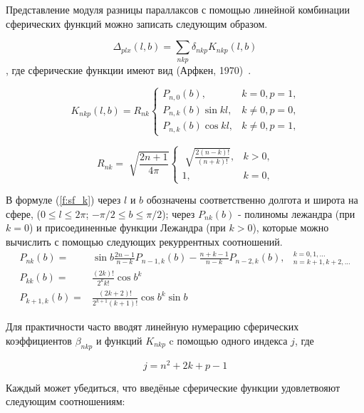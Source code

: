 \documentclass[14pt]{article} %
\begin{document}
Представление модуля разницы параллаксов с помощью линейной комбинации сферических функций можно записать следующим образом.


$$ \Delta_{plx} (l,b) = \sum_{nkp}\delta_{nkp}K_{nkp}(l,b) $$,
где сферические функции имеют вид (Арфкен, 1970)~\cite{book:arfken}.

\begin{equation}\label{f:sf_k}
K_{nkp}(l,b) = R_{nk} \left\{ \begin{array}{ll}
P_{n,0}(b), & \textrm{$k=0, p=1$,}\\
P_{n,k}(b)\sin{kl}, & \textrm{$k\neq0, p=0$,}\\
P_{n,k}(b)\cos{kl}, & \textrm{$k\neq0, p=1$,}
\end{array} \right.
\end{equation}

\begin{equation}
R_{nk} = \sqrt[]{\frac{2n+1}{4\pi}} \left\{ \begin{array}{cc}
\sqrt[]{\frac{2(n-k)!}{(n+k)!}}, & \textrm{$k>0$,}\\
1, & \textrm{$k=0$,}
\end{array} \right.
\end{equation}

В формуле (\ref{f:sf_k}) через $l$ и $b$ обозначены соответственно долгота и широта на сфере, ($0 \leq l \leq 2\pi$; $-\pi/2\leq b \leq \pi/2$); через $P_{nk}(b)$ - полиномы лежандра (при $k = 0$) и присоединенные функции Лежандра (при $k > 0$), которые можно вычислить с помощью следующих рекуррентных соотношений. 
\begin{equation}
\begin{array}{rll}
P_{nk}(b)=&\sin{b\frac{2n-1}{n-k}}P_{n-1,k}(b)-\frac{n+k-1}{n-k}P_{n-2,k}(b), & {}^{k=0,1,...}_{n=k+1,k+2,...}\\
P_{kk}(b)=&\frac{(2k)!}{2^{k}k!}{\cos{b}}^{k}\\
P_{k+1,k}(b)=&\frac{(2k+2)!}{2^{k+1}(k+1)!}{\cos{b}}^{k}\sin{b}
\end{array}
\end{equation}

Для практичности часто вводят линейную нумерацию  сферических коэффициентов $\beta_{nkp}$ и функций $K_{nkp}$ c помощью одного индекса $j$, где

\begin{equation}\label{f:sf_j}
j = n^2 + 2k + p -1
\end{equation}

Каждый может убедиться, что введёные сферические функции удовлетвояют следующим соотношениям:
\end{document}
